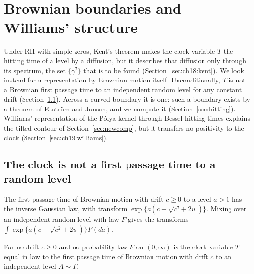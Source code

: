 \section{Brownian boundaries and Williams' structure}\label{ch:boundaries}

Under RH with simple zeros, Kent's theorem makes the clock variable $T$ the hitting time of a level by a diffusion, but it describes that diffusion only through its spectrum, the set $\{\gamma^2\}$ that is to be found (Section~\ref{sec:ch18:kent}). We look instead for a representation by Brownian motion itself. Unconditionally, $T$ is not a Brownian first passage time to an independent random level for any constant drift (Section~\ref{sec:ch19:nogo}). Across a curved boundary it is one: such a boundary exists by a theorem of Ekstr\"om and Janson, and we compute it (Section~\ref{sec:hitting}). Williams' representation of the P\'olya kernel through Bessel hitting times explains the tilted contour of Section~\ref{sec:newcomp}, but it transfers no positivity to the clock (Section~\ref{sec:ch19:williams}).

\subsection{The clock is not a first passage time to a random level}\label{sec:ch19:nogo}

The first passage time of Brownian motion with drift $c\ge0$ to a level $a>0$ has the inverse Gaussian law, with transform $\exp\{a(c-\sqrt{c^2+2u})\}$. Mixing over an independent random level with law $F$ gives the transforms $\int\exp\{a(c-\sqrt{c^2+2u})\}F(da)$.

\begin{proposition}\label{prop:nogo}
For no drift $c\ge0$ and no probability law $F$ on $(0,\infty)$ is the clock variable $T$ equal in law to the first passage time of Brownian motion with drift $c$ to an independent level $A\sim F$.
\end{proposition}

